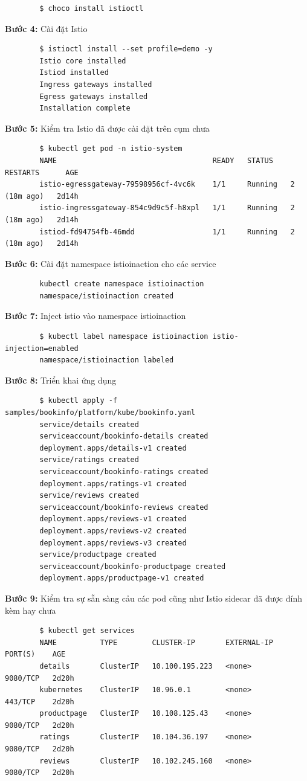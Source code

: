 \documentclass[12pt,a4paper]{report}
\begin{document}
{{\begin{lstlisting}
		$ choco install istioctl
	\end{lstlisting}
	\textbf{Bước 4:} Cài đặt Istio
	\begin{lstlisting}
		$ istioctl install --set profile=demo -y
		Istio core installed
		Istiod installed
		Ingress gateways installed
		Egress gateways installed
		Installation complete                                                        
	\end{lstlisting}
	\textbf{Bước 5:} Kiểm tra Istio đã được cài đặt trên cụm chưa
	\begin{lstlisting}
		$ kubectl get pod -n istio-system
		NAME                                    READY   STATUS    RESTARTS      AGE
		istio-egressgateway-79598956cf-4vc6k    1/1     Running   2 (18m ago)   2d14h
		istio-ingressgateway-854c9d9c5f-h8xpl   1/1     Running   2 (18m ago)   2d14h
		istiod-fd94754fb-46mdd                  1/1     Running   2 (18m ago)   2d14h
	\end{lstlisting}
	\textbf{Bước 6:} Cài đặt namespace istioinaction cho các service 
	\begin{lstlisting}
		kubectl create namespace istioinaction
		namespace/istioinaction created
	\end{lstlisting}
	\textbf{Bước 7:} Inject istio vào namespace istioinaction
	\begin{lstlisting}
		$ kubectl label namespace istioinaction istio-injection=enabled
		namespace/istioinaction labeled
	\end{lstlisting}
	\textbf{Bước 8:} Triển khai ứng dụng 
	\begin{lstlisting}
		$ kubectl apply -f samples/bookinfo/platform/kube/bookinfo.yaml
		service/details created
		serviceaccount/bookinfo-details created
		deployment.apps/details-v1 created
		service/ratings created
		serviceaccount/bookinfo-ratings created
		deployment.apps/ratings-v1 created
		service/reviews created
		serviceaccount/bookinfo-reviews created
		deployment.apps/reviews-v1 created
		deployment.apps/reviews-v2 created
		deployment.apps/reviews-v3 created
		service/productpage created
		serviceaccount/bookinfo-productpage created
		deployment.apps/productpage-v1 created
	\end{lstlisting}
	\textbf{Bước 9:} Kiểm tra sự sẵn sàng cảu các pod cũng như Istio sidecar đã được đính kèm hay chưa
	\begin{lstlisting}
		$ kubectl get services
		NAME          TYPE        CLUSTER-IP       EXTERNAL-IP   PORT(S)    AGE
		details       ClusterIP   10.100.195.223   <none>        9080/TCP   2d20h
		kubernetes    ClusterIP   10.96.0.1        <none>        443/TCP    2d20h
		productpage   ClusterIP   10.108.125.43    <none>        9080/TCP   2d20h
		ratings       ClusterIP   10.104.36.197    <none>        9080/TCP   2d20h
		reviews       ClusterIP   10.102.245.160   <none>        9080/TCP   2d20h
		

\end{lstlisting}}}
\end{document}
